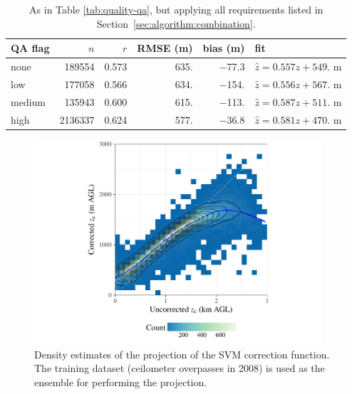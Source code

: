 \documentclass[essd,manuscript]{copernicus}\usepackage[]{graphicx}\usepackage[]{color}
\newenvironment{knitrout}{}{} %
\begin{document}
\begin{table}
  \centering
  \caption{As in Table \ref{tab:quality-qa}, but applying all 
    requirements listed in Section~\ref{sec:algorithm:combination}.}
  \label{tab:quality-qa-other-cuts}
\begin{tabular}{lrrrrl}
  \hline
\hline
QA flag & $n$ & $r$ & RMSE (m) & bias (m) & fit \\ 
  \hline
none & 189554 & 0.573 & 635. & $-$77.3 & $\hat{z} = 0.557 z + 549.$ m \\ 
  low & 177058 & 0.566 & 634. & $-$154. & $\hat{z} = 0.556 z + 567.$ m \\ 
  medium & 135943 & 0.600 & 615. & $-$113. & $\hat{z} = 0.587 z + 511.$ m \\ 
  high & 2136337 & 0.624 & 577. & $-$36.8 & $\hat{z} = 0.581 z + 470.$ m \\ 
   \hline
\hline
\end{tabular}

\end{table}

\begin{figure}
  \centering
\begin{knitrout}
\color{fgcolor}

{\centering \includegraphics[width=0.95\textwidth]{figure/method-eval-svm-corr-1} 

}



\end{knitrout}
  \caption{Density estimates of the projection of the SVM correction function.
    The training dataset (ceilometer overpasses in 2008) is used as the ensemble
    for performing the projection.}
  \label{fig:svm-correction}
\end{figure}
\end{document}
